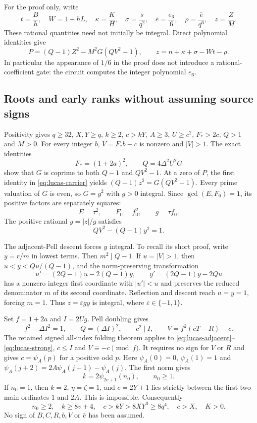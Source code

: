 For the proof only, write
\[
 t=\frac Bh,\quad W=1+hL,\quad \kappa=\frac KH,\quad
 \sigma=\frac{s}{q^2},\quad \bar e=\frac{e_6}{6},\quad
 \rho=\frac{\bar e}{q^6},\quad z=\frac ZM.
\]
These rational quantities need not initially be integral.  Direct polynomial
identities give
\begin{equation}
 P=(Q-1)Z^2-M^2G(QV^2-1),\qquad
 z=n+\kappa+\sigma-Wt-\rho.
 \label{eq:lucas-carrier}
\end{equation}
In particular the appearance of $1/6$ in the proof does not introduce a
rational-coefficient gate: the circuit computes the integer polynomial $e_6$.

\subsection{Roots and early ranks without assuming source signs}

Positivity gives $q\ge32$, $X,Y\ge q$, $k\ge2$, $c>kY$, $A\ge3$,
$U\ge c^2$, $F_*>2c$, $Q>1$ and $M>0$.  For every integer $b$,
$V=F_*b-c$ is nonzero and $|V|>1$.  The exact identities
\[
 F_*=(1+2a)^2,\qquad Q=4\Delta^2U^2G
\]
show that $G$ is coprime to both $Q-1$ and $QV^2-1$.  At a zero of $P$,
the first identity in \eqref{eq:lucas-carrier} yields
$(Q-1)z^2=G(QV^2-1)$.  Every prime valuation of $G$ is even, so
$G=g^2$ with $g>0$ integral.  Since $\gcd(E,F_0)=1$, its positive factors
are separately squares:
\[
 E=\tau^2,\qquad F_0=f_0^2,\qquad g=\tau f_0.
\]
The positive rational $y=|z|/g$ satisfies
\begin{equation}
 QV^2-(Q-1)y^2=1.
 \label{eq:lucas-adjacent}
\end{equation}

The adjacent-Pell descent forces $y$ integral.  To recall its short proof,
write $y=r/m$ in lowest terms.  Then $m^2\mid Q-1$.  If $u=|V|>1$, then
$u<y<Qu/(Q-1)$, and the norm-preserving transformation
\[
 u'=(2Q-1)u-2(Q-1)y,\qquad
 y'=(2Q-1)y-2Qu
\]
has a nonzero integer first coordinate with $|u'|<u$ and preserves the
reduced denominator $m$ of its second coordinate.  Reflection and descent
reach $u=y=1$, forcing $m=1$.  Thus $z=\varepsilon gy$ is integral,
where $\varepsilon\in\{-1,1\}$.

Set $f=1+2a$ and $I=2Ug$.  Pell doubling gives
\begin{equation}
 f^2-\Delta I^2=1,\qquad Q=(\Delta I)^2,\qquad c^2\mid I,
 \qquad V=f^2(cT-R)-c.
 \label{eq:lucas-strong}
\end{equation}
The retained signed all-index folding theorem applies to
\eqref{eq:lucas-adjacent}--\eqref{eq:lucas-strong}, $c\le I$ and
$V\equiv-c\pmod f$.  It requires no sign for $V$ or $R$ and gives
$c=\psi_A(p)$ for a positive odd $p$.  Here $\psi_A(0)=0$,
$\psi_A(1)=1$ and $\psi_A(j+2)=2A\psi_A(j+1)-\psi_A(j)$.
The first norm gives
\[
 k=2\psi_{2v+1}(n_0),\qquad n_0\ge1.
\]
If $n_0=1$, then $k=2$, $\eta=\zeta=1$, and $c=2Y+1$ lies strictly
between the first two main ordinates $1$ and $2A$.  This is impossible.
Consequently
\begin{equation}
 n_0\ge2,\quad k\ge8v+4,\quad
 c>kY>8XY^3\ge8q^4,\quad c>X,\quad K>0.
 \label{eq:lucas-early-growth}
\end{equation}
No sign of $B,C,R,b,V$ or $\bar e$ has been assumed.

